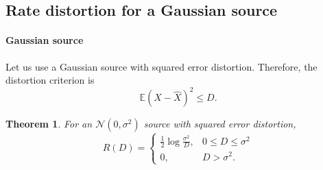 \documentclass[a4paper, 11pt, openany]{book}
\numberwithin{equation}{section}
\theoremstyle{plain}
\newtheorem{theorem}	[equation]	{Theorem}
\theoremstyle{definition}
\newcommand{\expectation}{\mathbb{E}}
\newcommand{\alphabet}[1]{\mathcal{#1}}
\begin{document}
% 


%
%
%



\subsection{Rate distortion for a Gaussian source}


\paragraph{Gaussian source}

Let us use a Gaussian source with squared error distortion. Therefore, the distortion criterion is
\[
	\expectation(X - \hat{X})^2 \le D.
\]

\begin{theorem} \label{th:gaussian_R}
For an $\alphabet{N}(0,\sigma^2)$ source with squared error distortion,
\[
	R(D) = \begin{cases}
	\frac{1}{2} \log \frac{\sigma^2}{D}, & 0 \le D \le \sigma^2\\
	0, & D > \sigma^2.
	\end{cases}
\]
\end{theorem}
\end{document}
